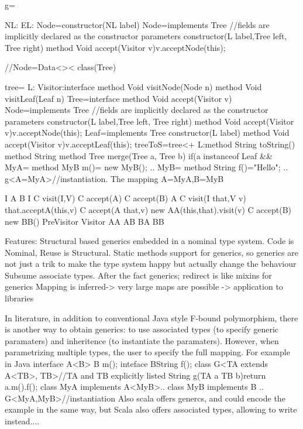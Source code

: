 g={
 NL:{}
 EL:{}
 Node={constructor(NL label)
    }
    Node={implements Tree
      //fields are implicitly declared as the constructor parameters
      constructor(L label,Tree left, Tree right)
      method Void accept(Visitor v){v.acceptNode(this);}
    }

  


//Node=Data<>< class(Tree){}

  tree={
    L:{}
    Visitor:{interface
      method Void visitNode(Node n)
      method Void visitLeaf(Leaf n)
    }
    Tree={interface      
      method Void accept(Visitor v)
    }
    Node={implements Tree
      //fields are implicitly declared as the constructor parameters
      constructor(L label,Tree left, Tree right)
      method Void accept(Visitor v){v.acceptNode(this);}
    }
    Leaf={implements Tree
      constructor(L label)
      method Void accept(Visitor v){v.acceptLeaf(this);}
    }
  }
  treeToS=tree<+{
      L:{method String toString()}
      method String 
      method Tree merge(Tree a, Tree b){
        if(a instanceof Leaf &&
        }
    }
    MyA={ method MyB m()= new MyB(); ..}
    MyB={ method String f()="Hello"; ..}
    g<A=MyA>//instantiation. The mapping A=MyA,B=MyB


I A B
I{ C visit(I,V) C accept(A) C accept(B)}
A{ 
  C visit(I that,V v) that.acceptA(this,v)
  C accept(A that,v) new AA(this,that).visit(v)
  C accept(B) new BB()
}
PreVisitor
Visitor AA AB BA BB




Features:
Structural based generics embedded in a nominal type system.
Code is Nominal, Reuse is Structural.
Static methods support for generics, so generics are not just a trik to make the type system happy but actually
change the behaviour
Subsume associate types.
After the fact generics; redirect is like mixins for generics
Mapping is inferred-> very large maps are possible -> application to libraries


In literature, in addition to conventional Java style F-bound polymorphism, there is
another way to obtain generics: to use associated types (to specify generic paramaters) and inheritence (to instantiate the paramaters).
However, when parametrizing multiple types, the user to specify the full mapping.
For example in Java
    interface A<B>{ B m(); }
    inteface B{String f();}
    class G<TA extends A<TB>, TB>{//TA and TB explicitly listed
      String g(TA a TB b){return a.m().f();}
    }
    class MyA implements A<MyB>{..}
    class MyB implements B {..}
    G<MyA,MyB>//instantiation
Also scala offers genercs, and could encode the example in the same way, but Scala
also offers associated types, allowing to write instead....

}
